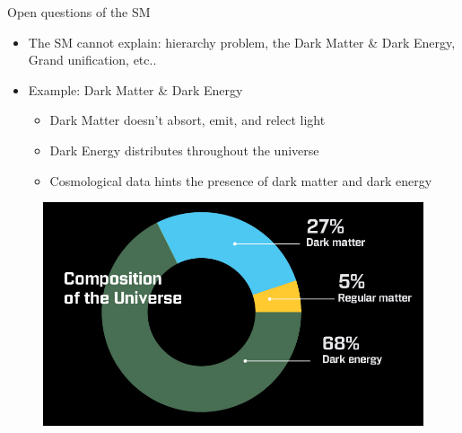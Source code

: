 \documentclass{beamer}
\begin{document}
\begin{frame}{Open questions of the SM}
    \begin{itemize}
        \item The SM cannot explain: hierarchy problem, the Dark Matter \& Dark Energy, Grand unification, etc..
        \item Example: Dark Matter \& Dark Energy
        \begin{itemize}
            \item Dark Matter doesn't absort, emit, and relect light
            \item Dark Energy distributes throughout the universe
            \item Cosmological data hints the presence of dark matter and dark energy
        \end{itemize}
    \end{itemize}
    \begin{figure}
        \includegraphics[scale=0.3]{figures/composition-of-universe.jpg}
    \end{figure}
\end{frame}
\end{document}
